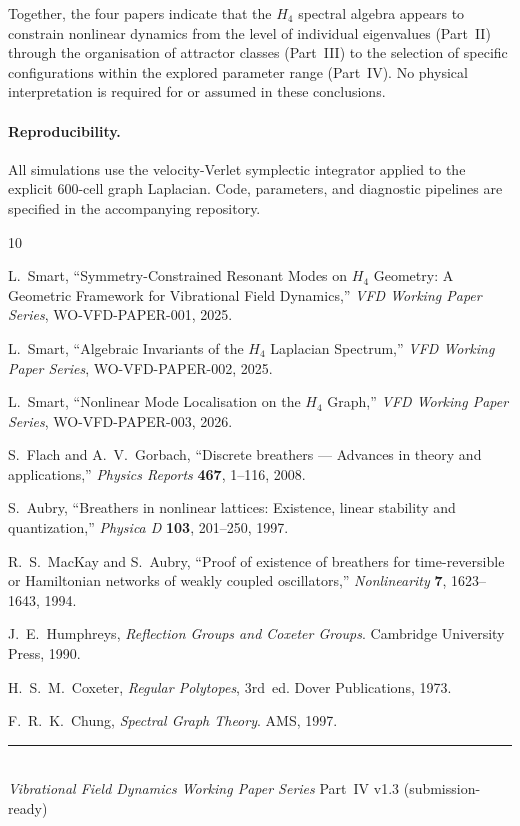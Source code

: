 \documentclass[12pt,a4paper]{article}
\newcommand{\Hfour}{H_4}
\begin{document}
Together, the four papers indicate that the $\Hfour$ spectral algebra
appears to constrain nonlinear dynamics from the level of individual
eigenvalues (Part~II) through the organisation of attractor classes
(Part~III) to the selection of specific configurations within the
explored parameter range (Part~IV).  No physical interpretation is
required for or assumed in these conclusions.

\paragraph{Reproducibility.}
All simulations use the velocity-Verlet symplectic integrator applied
to the explicit 600-cell graph Laplacian.  Code, parameters, and
diagnostic pipelines are specified in the accompanying repository.


\begin{thebibliography}{10}

L.~Smart,
``Symmetry-Constrained Resonant Modes on $H_4$ Geometry:
A Geometric Framework for Vibrational Field Dynamics,''
\textit{VFD Working Paper Series}, WO-VFD-PAPER-001, 2025.

L.~Smart,
``Algebraic Invariants of the $H_4$ Laplacian Spectrum,''
\textit{VFD Working Paper Series}, WO-VFD-PAPER-002, 2025.

L.~Smart,
``Nonlinear Mode Localisation on the $H_4$ Graph,''
\textit{VFD Working Paper Series}, WO-VFD-PAPER-003, 2026.

S.~Flach and A.~V.~Gorbach,
``Discrete breathers --- Advances in theory and applications,''
\textit{Physics Reports} \textbf{467}, 1--116, 2008.

S.~Aubry,
``Breathers in nonlinear lattices: Existence, linear stability
and quantization,''
\textit{Physica D} \textbf{103}, 201--250, 1997.

R.~S.~MacKay and S.~Aubry,
``Proof of existence of breathers for time-reversible or
Hamiltonian networks of weakly coupled oscillators,''
\textit{Nonlinearity} \textbf{7}, 1623--1643, 1994.

J.~E.~Humphreys,
\textit{Reflection Groups and Coxeter Groups}.
Cambridge University Press, 1990.

H.~S.~M.~Coxeter,
\textit{Regular Polytopes}, 3rd~ed.
Dover Publications, 1973.

F.~R.~K.~Chung,
\textit{Spectral Graph Theory}.
AMS, 1997.

\end{thebibliography}

\vfill
\noindent\rule{\textwidth}{0.4pt}\\[4pt]
{\footnotesize
\textit{Vibrational Field Dynamics Working Paper Series}
\hfill Part~IV \quad v1.3 (submission-ready)}
\end{document}
